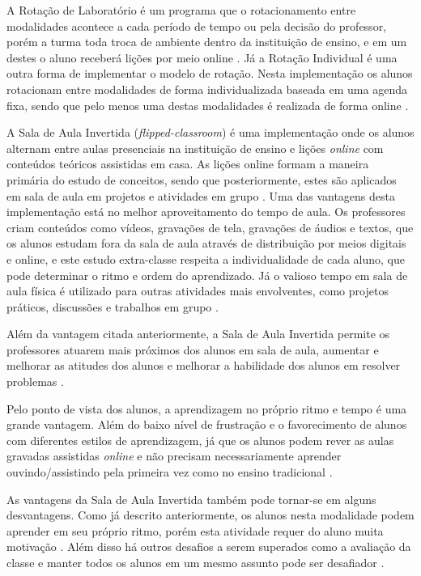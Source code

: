 A Rotação de Laboratório é um programa que o rotacionamento entre modalidades acontece a cada período de tempo ou pela decisão do professor, porém a turma toda troca de ambiente dentro da instituição de ensino, e em um destes o aluno receberá lições por meio online \cite{staker_classifying_2012}. Já a Rotação Individual é uma outra forma de implementar o modelo de rotação. Nesta implementação os alunos rotacionam entre modalidades de forma individualizada baseada em uma agenda fixa, sendo que pelo menos uma destas modalidades é realizada de forma online \cite{staker_classifying_2012}.

A Sala de Aula Invertida (\emph{flipped-classroom}) é uma implementação onde os alunos alternam entre aulas presenciais na instituição de ensino e lições \emph{online} com conteúdos teóricos assistidas em casa. As lições online formam a maneira primária do estudo de conceitos, sendo que posteriormente, estes são aplicados em sala de aula em projetos e atividades em grupo \cite{staker_classifying_2012}. Uma das vantagens desta implementação está no melhor aproveitamento do tempo de aula. Os professores criam conteúdos como vídeos, gravações de tela, gravações de áudios e textos, que os alunos estudam fora da sala de aula através de distribuição por meios digitais e online, e este estudo extra-classe respeita a individualidade de cada aluno, que pode determinar o ritmo e ordem do aprendizado. Já o valioso tempo em sala de aula física é utilizado para outras atividades mais envolventes, como projetos práticos, discussões e trabalhos em grupo \cite{milman_flipped_2012}.

Além da vantagem citada anteriormente, a Sala de Aula Invertida permite os professores atuarem mais próximos dos alunos em sala de aula, aumentar e melhorar as atitudes dos alunos e melhorar a habilidade dos alunos em resolver problemas \cite{fulton_10_2012}. 

Pelo ponto de vista dos alunos, a aprendizagem no próprio ritmo e tempo é uma grande vantagem. Além do baixo nível de frustração e o favorecimento de alunos com diferentes estilos de aprendizagem, já que os alunos podem rever as aulas gravadas assistidas \emph{online} e não precisam necessariamente aprender ouvindo/assistindo pela primeira vez como no ensino tradicional \cite{fulton_10_2012}.

As vantagens da Sala de Aula Invertida também pode tornar-se em alguns desvantagens. Como já descrito anteriormente, os alunos nesta modalidade podem aprender em seu próprio ritmo, porém esta atividade requer do aluno muita motivação \cite{du_flipped_2014}. Além disso há outros desafios a serem superados como a avaliação da classe e manter todos os alunos em um mesmo assunto pode ser desafiador \cite{du_flipped_2014}.

